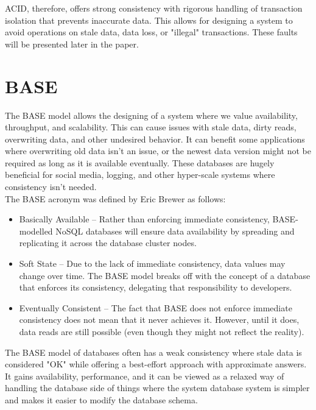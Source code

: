 \documentclass[a4paper,10pt,titlepage]{report}
\begin{document}
    ACID, therefore, offers strong consistency with rigorous handling of transaction isolation that prevents inaccurate data. This allows for designing a system to avoid operations on stale data, data loss, or "illegal" transactions. These faults will be presented later in the paper.


    \section{BASE}
    The BASE model allows the designing of a system where we value availability, throughput, and scalability. This can cause issues with stale data, dirty reads, overwriting data, and other undesired behavior. It can benefit some applications where overwriting old data isn't an issue, or the newest data version might not be required as long as it is available eventually. These databases are hugely beneficial for social media, logging, and other hyper-scale systems where consistency isn't needed.\\
    \vspace{5mm}
    The BASE acronym was defined by Eric Brewer\cite{brewer2000towards} as follows:

    \begin{itemize}
        \item Basically Available – Rather than enforcing immediate consistency, BASE-modelled NoSQL databases will ensure data availability by spreading and replicating it across the database cluster nodes.
        \item Soft State – Due to the lack of immediate consistency, data values may change over time. The BASE model breaks off with the concept of a database that enforces its consistency, delegating that responsibility to developers.
        \item Eventually Consistent – The fact that BASE does not enforce immediate consistency does not mean that it never achieves it. However, until it does, data reads are still possible (even though they might not reflect the reality).
    \end{itemize}

    The BASE model of databases often has a weak consistency where stale data is considered "OK" while offering a best-effort approach with approximate answers. It gains availability, performance, and it can be viewed as a relaxed way of handling the database side of things where the system database system is simpler and makes it easier to modify the database schema.
\end{document}
